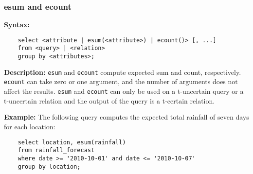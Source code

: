 \subsubsection{esum and ecount}

\noindent \textbf{Syntax:}
\begin{verbatim}
	select <attribute | esum(<attribute>) | ecount()> [, ...]
	from <query> | <relation>
	group by <attributes>; 
\end{verbatim}

\noindent \textbf{Description:}
{\tt esum} and {\tt ecount} compute expected sum and count, respectively. {\tt ecount} can take zero or one argument, and the number of arguments does not affect the results. {\tt esum} and {\tt ecount} can only be used on a t-uncertain query or a t-uncertain relation and the output of the query is a t-certain relation.

\noindent \textbf{Example:}
The following query  computes the expected total rainfall of seven days for each location:
\begin{verbatim}
	select location, esum(rainfall)
	from rainfall_forecast
	where date >= '2010-10-01' and date <= '2010-10-07'
	group by location; 
\end{verbatim}



